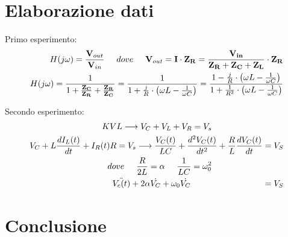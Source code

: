     \section{Elaborazione dati}
    Primo esperimento:
    \begin{equation}
        \begin{split}
            H(j\omega) = \frac{\mathbf{V}_{out}}{\mathbf{V}_{in}}
            \hspace{0.5cm} dove \hspace{0.5cm} \mathbf{V}_{out} = \mathbf{I} \cdot \mathbf{Z_{R}} = \frac{\mathbf{V_{in}}}{\mathbf{Z_R} + \mathbf{Z_C} + \mathbf{Z_L}}
            \cdot \mathbf{Z_R}
            \\
            H(j\omega) =  \frac{1}{1+\frac{\mathbf{Z_C}}{\mathbf{Z_R}} + \frac{\mathbf{Z_R}}{\mathbf{Z_C}}}
            = \frac{1}{1+\frac{j}{R} \cdot \bigl (\omega L - \frac{1}{\omega C} \bigr )} = 
            \frac{1 - \frac{j}{R} \cdot \bigl (\omega L - \frac{1}{\omega C} \bigr )}{1 + \frac{1}{R^2} \cdot \bigl (\omega L - \frac{1}{\omega C} \bigr )}
        \end{split}
    \end{equation}

    Secondo esperimento:
    \begin{equation}
        \begin{split}
            KVL \longrightarrow V_C + V_L + V_R = V_s \hspace{3cm}
            \\
            V_C + L\frac{dI_L(t)}{dt} + I_R(t)R = V_s \longrightarrow
            \frac{V_C(t)}{LC} + \frac{d^2V_C(t)}{dt^2} + \frac{R}{L} \frac{dV_C(t)}{dt} = V_S
            \\
            dove \hspace{0.5cm} \frac{R}{2L} = \alpha \hspace{0.5cm} \frac{1}{LC} = \omega_0^2 \hspace{3cm}
            \\
            \ddot{V_c(t)} + 2\alpha \dot{V_C} + \omega_0 \dot{V_C} \hspace{3cm} = V_S
        \end{split}
    \end{equation}

    \section{Conclusione}

